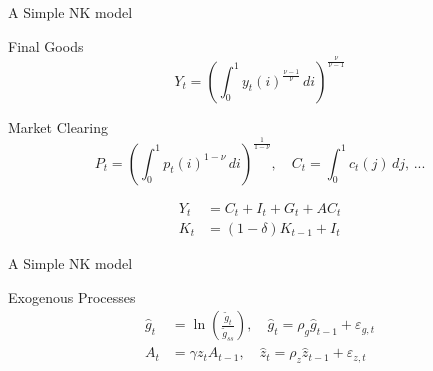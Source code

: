 \begin{frame}{A Simple NK model}
    \begin{block}{Final Goods}
        \begin{equation}
            Y_t = \left(\int_{0}^{1} y_t(i)^{\frac{\nu - 1}{\nu}}\, di\right)^{\frac{\nu}{\nu - 1}}
        \end{equation}
    \end{block}
    \begin{block}{Market Clearing}
        \begin{equation}
            P_t =\left( \int_{0}^{1} p_t(i)^{1 - \nu} \, di\right)^\frac{1}{1 - \nu}, \quad
            C_t = \int_{0}^{1} c_t(j) \, dj, \, ...
        \end{equation}

        \begin{align}
            Y_t &= C_t + I_t + G_t + AC_t\\
            K_t &= (1 - \delta) K_{t-1} + I_t
        \end{align}
    \end{block}
\end{frame}

\begin{frame}{A Simple NK model}
    \begin{block}{Exogenous Processes}
        \begin{align}
            \hat{g}_t &= \ln \left(\frac{\tilde{g}_t}{\tilde{g}_{ss}}\right), \quad \hat{g}_t = \rho_g \hat{g}_{t-1} +\varepsilon_{g, t}\\
            A_t &= \gamma z_t A_{t-1}, \quad \hat{z}_t = \rho_z \hat{z}_{t-1} + \varepsilon_{z, t}
        \end{align}
    \end{block}
\end{frame}

